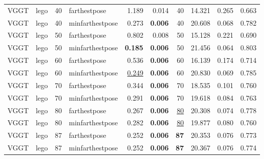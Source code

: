 \begin{table}[H]
\begin{tabular}{llrlrrrrrr}
VGGT & lego & 40 & farthestpose & 1.189 & 0.014 & 40 & 14.321 & 0.265 & 0.663 \\
VGGT & lego & 40 & minfarthestpose & 0.273 & \textbf{0.006} & 40 & 20.608 & 0.068 & 0.782 \\
VGGT & lego & 50 & farthestpose & 0.802 & 0.008 & 50 & 15.128 & 0.221 & 0.690 \\
VGGT & lego & 50 & minfarthestpose & \textbf{0.185} & \textbf{0.006} & 50 & 21.456 & 0.064 & 0.803 \\
VGGT & lego & 60 & farthestpose & 0.536 & \textbf{0.006} & 60 & 16.139 & 0.174 & 0.714 \\
VGGT & lego & 60 & minfarthestpose & \underline{0.249} & \textbf{0.006} & 60 & 20.830 & 0.069 & 0.785 \\
VGGT & lego & 70 & farthestpose & 0.344 & \textbf{0.006} & 70 & 18.535 & 0.101 & 0.760 \\
VGGT & lego & 70 & minfarthestpose & 0.291 & \textbf{0.006} & 70 & 19.618 & 0.084 & 0.763 \\
VGGT & lego & 80 & farthestpose & 0.267 & \textbf{0.006} & \underline{80} & 20.308 & 0.074 & 0.778 \\
VGGT & lego & 80 & minfarthestpose & 0.282 & \textbf{0.006} & \underline{80} & 19.877 & 0.080 & 0.760 \\
VGGT & lego & 87 & farthestpose & 0.252 & \textbf{0.006} & \textbf{87} & 20.353 & 0.076 & 0.773 \\
VGGT & lego & 87 & minfarthestpose & 0.252 & \textbf{0.006} & \textbf{87} & 20.367 & 0.076 & 0.774 \\
\bottomrule
\end{tabular}
\end{table}